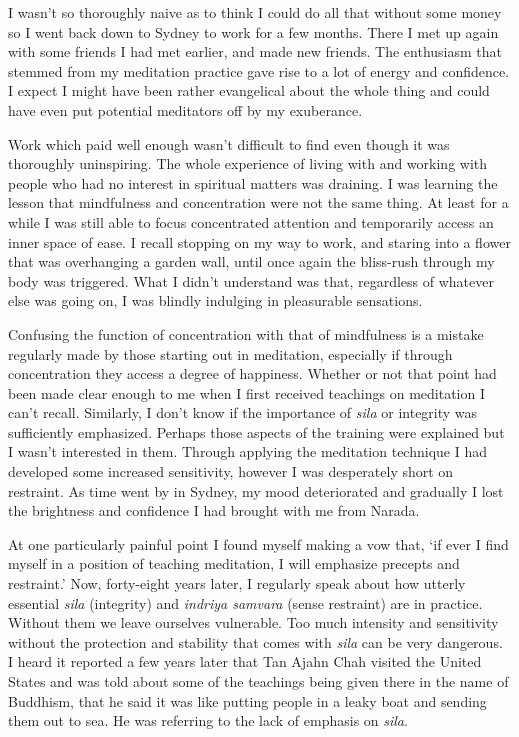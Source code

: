 I wasn't so thoroughly naive as to think I could do all that without
some money so I went back down to Sydney to work for a few months. There
I met up again with some friends I had met earlier, and made new
friends. The enthusiasm that stemmed from my meditation practice gave
rise to a lot of energy and confidence. I expect I might have been
rather evangelical about the whole thing and could have even put
potential meditators off by my exuberance.

Work which paid well enough wasn't difficult to find even though it was
thoroughly uninspiring. The whole experience of living with and working
with people who had no interest in spiritual matters was draining. I was
learning the lesson that mindfulness and concentration were not the same
thing. At least for a while I was still able to focus concentrated
attention and temporarily access an inner space of ease. I recall
stopping on my way to work, and staring into a flower that was
overhanging a garden wall, until once again the bliss-rush through my
body was triggered. What I didn't understand was that, regardless of
whatever else was going on, I was blindly indulging in pleasurable
sensations.

Confusing the function of concentration with that of mindfulness is a
mistake regularly made by those starting out in meditation, especially
if through concentration they access a degree of happiness. Whether or
not that point had been made clear enough to me when I first received
teachings on meditation I can't recall. Similarly, I don't know if the
importance of \emph{sila} or integrity was sufficiently emphasized.
Perhaps those aspects of the training were explained but I wasn't
interested in them. Through applying the meditation technique I had
developed some increased sensitivity, however I was desperately short on
restraint. As time went by in Sydney, my mood deteriorated and gradually
I lost the brightness and confidence I had brought with me from Narada.

At one particularly painful point I found myself making a vow that, `if
ever I find myself in a position of teaching meditation, I will
emphasize precepts and restraint.' Now, forty-eight years later,
I regularly speak about how utterly essential \emph{sila} (integrity)
and \emph{indriya samvara} (sense restraint) are in practice. Without
them we leave ourselves vulnerable. Too much intensity and sensitivity
without the protection and stability that comes with \emph{sila} can be
very dangerous. I heard it reported a few years later that Tan Ajahn
Chah visited the United States and was told about some of the teachings
being given there in the name of Buddhism, that he said it was like
putting people in a leaky boat and sending them out to sea. He was
referring to the lack of emphasis on \emph{sila}.

